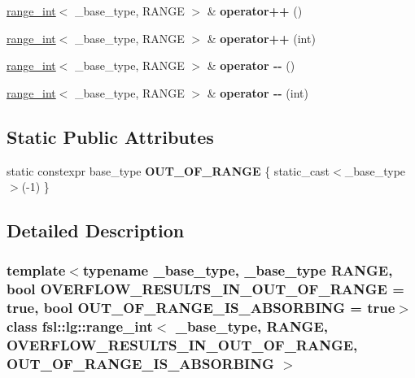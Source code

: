 \begin{DoxyCompactItemize}
\item 
\mbox{\label{classfsl_1_1lg_1_1range__int_af8c27e250cc54c4f3ed3b089bb785918}} 
\mbox{\hyperlink{classfsl_1_1lg_1_1range__int}{range\+\_\+int}}$<$ \+\_\+base\+\_\+type, R\+A\+N\+GE $>$ \& {\bfseries operator++} ()
\item 
\mbox{\label{classfsl_1_1lg_1_1range__int_ad5a6f6327494cd861a26a02f0d5ee853}} 
\mbox{\hyperlink{classfsl_1_1lg_1_1range__int}{range\+\_\+int}}$<$ \+\_\+base\+\_\+type, R\+A\+N\+GE $>$ \& {\bfseries operator++} (int)
\item 
\mbox{\label{classfsl_1_1lg_1_1range__int_a6f0f129cec8546914474e05b547a1a0c}} 
\mbox{\hyperlink{classfsl_1_1lg_1_1range__int}{range\+\_\+int}}$<$ \+\_\+base\+\_\+type, R\+A\+N\+GE $>$ \& {\bfseries operator -\/-\/} ()
\item 
\mbox{\label{classfsl_1_1lg_1_1range__int_a41dd2ef65ab85c659b0f6cc069abdbbe}} 
\mbox{\hyperlink{classfsl_1_1lg_1_1range__int}{range\+\_\+int}}$<$ \+\_\+base\+\_\+type, R\+A\+N\+GE $>$ \& {\bfseries operator -\/-\/} (int)
\end{DoxyCompactItemize}
\subsection*{Static Public Attributes}
\begin{DoxyCompactItemize}
\item 
\mbox{\label{classfsl_1_1lg_1_1range__int_ad2c724f2b6b690d1217d51ef4b712225}} 
static constexpr base\+\_\+type {\bfseries O\+U\+T\+\_\+\+O\+F\+\_\+\+R\+A\+N\+GE} \{ static\+\_\+cast$<$\+\_\+base\+\_\+type$>$(-\/1) \}
\end{DoxyCompactItemize}


\subsection{Detailed Description}
\subsubsection*{template$<$typename \+\_\+base\+\_\+type, \+\_\+base\+\_\+type R\+A\+N\+GE, bool O\+V\+E\+R\+F\+L\+O\+W\+\_\+\+R\+E\+S\+U\+L\+T\+S\+\_\+\+I\+N\+\_\+\+O\+U\+T\+\_\+\+O\+F\+\_\+\+R\+A\+N\+GE = true, bool O\+U\+T\+\_\+\+O\+F\+\_\+\+R\+A\+N\+G\+E\+\_\+\+I\+S\+\_\+\+A\+B\+S\+O\+R\+B\+I\+NG = true$>$\newline
class fsl\+::lg\+::range\+\_\+int$<$ \+\_\+base\+\_\+type, R\+A\+N\+G\+E, O\+V\+E\+R\+F\+L\+O\+W\+\_\+\+R\+E\+S\+U\+L\+T\+S\+\_\+\+I\+N\+\_\+\+O\+U\+T\+\_\+\+O\+F\+\_\+\+R\+A\+N\+G\+E, O\+U\+T\+\_\+\+O\+F\+\_\+\+R\+A\+N\+G\+E\+\_\+\+I\+S\+\_\+\+A\+B\+S\+O\+R\+B\+I\+N\+G $>$}

